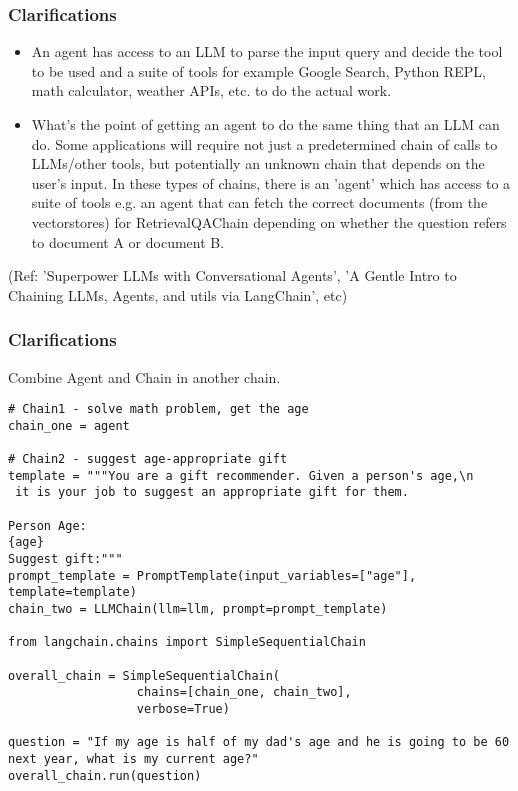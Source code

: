 \begin{frame}[fragile]\frametitle{Clarifications}

\begin{itemize}
\item An agent has access to an LLM to parse the input query and decide the tool to be used and a suite of tools for example Google Search, Python REPL, math calculator, weather APIs, etc. to do the actual work.
\item What’s the point of getting an agent to do the same thing that an LLM can do. Some applications will require not just a predetermined chain of calls to LLMs/other tools, but potentially an unknown chain that depends on the user’s input. In these types of chains, there is an 'agent' which has access to a suite of tools e.g. an agent that can fetch the correct documents (from the vectorstores) for RetrievalQAChain depending on whether the question refers to document A or document B.
\end{itemize}

{\tiny (Ref: 'Superpower LLMs with Conversational Agents', 'A Gentle Intro to Chaining LLMs, Agents, and utils via LangChain', etc)}
\end{frame}

\begin{frame}[fragile]\frametitle{Clarifications}

Combine Agent and Chain in another chain.

\begin{lstlisting}
# Chain1 - solve math problem, get the age
chain_one = agent

# Chain2 - suggest age-appropriate gift
template = """You are a gift recommender. Given a person's age,\n
 it is your job to suggest an appropriate gift for them.

Person Age:
{age}
Suggest gift:"""
prompt_template = PromptTemplate(input_variables=["age"], template=template)
chain_two = LLMChain(llm=llm, prompt=prompt_template) 

from langchain.chains import SimpleSequentialChain

overall_chain = SimpleSequentialChain(
                  chains=[chain_one, chain_two],
                  verbose=True)
				  
question = "If my age is half of my dad's age and he is going to be 60 next year, what is my current age?"
overall_chain.run(question)				  
\end{lstlisting}

\end{frame}


